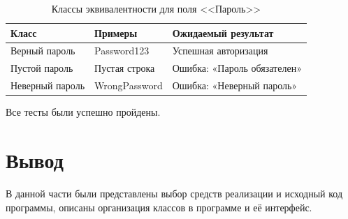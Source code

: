 \newpage

\begin{table}[h]
	\centering
	\caption{Классы эквивалентности для поля <<Пароль>>}
	\label{tbl:password-classes}
	\begin{tabularx}{\textwidth}{|X|X|X|}
		\hline
		\textbf{Класс} & \textbf{Примеры} & \textbf{Ожидаемый результат} \\
		\hline
		Верный пароль & Password123 & Успешная авторизация \\
		\hline
		Пустой пароль & Пустая строка & Ошибка: «Пароль обязателен» \\
		\hline
		Неверный пароль & WrongPassword & Ошибка: «Неверный пароль» \\
		\hline
	\end{tabularx}
\end{table}

Все тесты были успешно пройдены.

\section{Вывод}

В данной части были представлены выбор средств реализации и исходный код программы, описаны организация классов в программе и её интерфейс.

\clearpage
